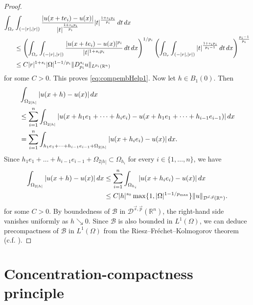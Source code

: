 \documentclass[11pt]{amsart}
\theoremstyle{plain}
\theoremstyle{definition}
\numberwithin{equation}{section}
\renewcommand{\d}{\textnormal{d}}
\newcommand{\R}{\mathbb{R}}
\newcommand{\Dsp}{\mathcal{D}^{\vec{s},\vec{p}}(\mathbb{R}^n)}
\begin{document}
\begin{proof}
\begin{equation*}
\begin{split}
\int_{\Omega_r} &\int_{(-\vert r \vert,\vert r\vert)} \frac{\vert u(x+te_i) - u(x) \vert}{\vert t \vert^{\frac{1+s_ip_i}{p_i}}} \vert t \vert^{\frac{1+s_ip_i}{p_i}}\, \d t \, \d x\\
&\le \left(\int_{\Omega_r} \int_{(-\vert r\vert,\vert r\vert)} \frac{\vert u(x+te_i) - u(x) \vert^{p_i}}{\vert t \vert^{1+s_ip_i}} \, \d t \, \d x \right)^{1/p_i} \left( \int_{\Omega_r} \int_{(-\vert r\vert,\vert r\vert)} \vert t \vert^{\frac{1+s_ip_i}{p_i-1}} \, \d t \,  \d x \right)^{\frac{p_i-1}{p_i}}\\
&\le C\vert r \vert^{1+s_i} \vert \Omega \vert^{1-1/p_i} \Vert D^{s_i}_{p_i} u \Vert_{L^{p_i}(\R^n)} 
\end{split}
\end{equation*}
for some $C>0$. This proves \eqref{eq:compembHelp1}. Now let $h \in B_1(0)$.
Then
\begin{equation*}
\begin{split}
& \int_{\Omega_{2|h|}} \vert u(x+h) - u(x) \vert \, \d x \\
&\leq \sum_{i=1}^n \int_{\Omega_{2|h|}} \vert u(x+h_1e_1+\cdots+h_i e_i) - u(x+h_1e_1+\cdots+h_{i-1}e_{i-1}) \vert \, \d x \\
&= \sum_{i=1}^n \int_{h_1e_1+\cdots+h_{i-1}e_{i-1}+\Omega_{2|h|}} \vert u(x+h_i e_i) - u(x) \vert \, \d x.
\end{split}
\end{equation*}
Since $h_1e_1+\dots+h_{i-1}e_{i-1}+\Omega_{2|h|} \subset \Omega_{h_i}$ for every $i \in \{1,\dots,n\}$, we have
\begin{equation*}
\begin{split}
\int_{\Omega_{2|h|}} \vert u(x+h) - u(x) \vert \, \d x
&\leq \sum_{i=1}^n \int_{\Omega_{h_i}} \vert u(x+h_i e_i) - u(x) \vert \, \d x \\
&\le C \vert h \vert^{s_{0}} \max \lbrace 1, \vert \Omega \vert^{1-1/p_{\max}} \rbrace \Vert u \Vert_{\Dsp}.
\end{split}
\end{equation*}
for some $C>0$. By boundedness of $\mathcal{B}$ in $\Dsp$, the right-hand side vanishes uniformly as $h \searrow 0$. Since $\mathcal{B}$ is also bounded in $L^1(\Omega)$, we can deduce precompactness of $\mathcal{B}$ in $L^1(\Omega)$ from the Riesz–Fr\'echet–Kolmogorov theorem (c.f. \cite[Theorem 1.95]{DD12}).
\end{proof}






\section{Concentration-compactness principle} \label{sec:CCP}
\end{document}
